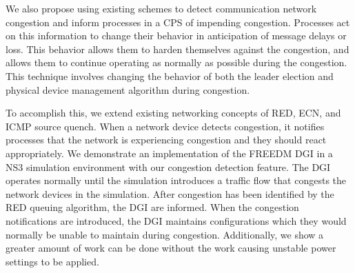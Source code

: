 We also propose using existing schemes to detect communication network congestion and inform processes in a \ac{CPS} of impending congestion.
Processes act on this information to change their behavior in anticipation of message delays or loss.
This behavior allows them to harden themselves against the congestion, and allows them to continue operating as normally as possible during the congestion.
This technique involves changing the behavior of both the leader election\cite{INVITATIONELECTION} and physical device management algorithm during congestion.

To accomplish this, we extend existing networking concepts of \ac{RED}, \ac{ECN}\cite{RFCECN}, and ICMP source quench\cite{RFCSOURCEQUENCH}.
When a network device detects congestion, it notifies processes that the network is experiencing congestion and they should react appropriately.
We demonstrate an implementation of the \ac{FREEDM} \ac{DGI} in a \ac{NS3} simulation environment\cite{NS3} with our congestion detection feature.
The \ac{DGI} operates normally until the simulation introduces a traffic flow that congests the network devices in the simulation.
After congestion has been identified by the \ac{RED} queuing algorithm, the \ac{DGI} are informed. %
When the congestion notifications are introduced, the \ac{DGI} maintains configurations which they would normally be unable to maintain during congestion.
Additionally, we show a greater amount of work can be done without the work causing unstable power settings to be applied.

